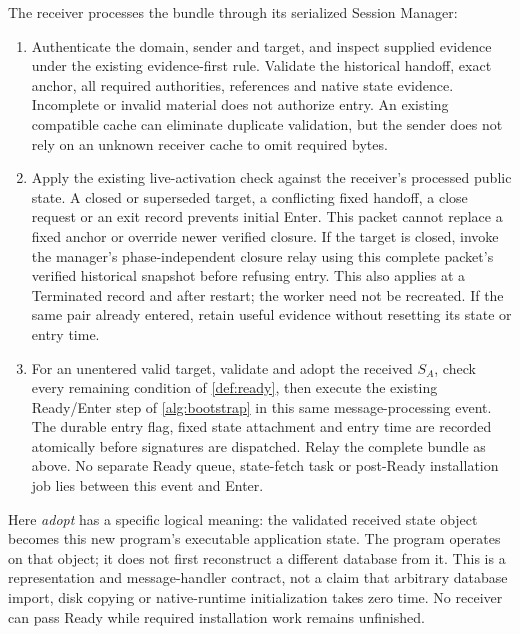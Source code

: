 The receiver processes the bundle through its serialized Session Manager:
\begin{enumerate}[label=(\roman*),itemsep=2pt]
\item Authenticate the domain, sender and target, and inspect supplied
evidence under the existing evidence-first rule. Validate the historical
handoff, exact anchor, all required authorities, references and native
state evidence. Incomplete or invalid material does not authorize entry.
An existing compatible cache can eliminate duplicate validation, but the
sender does not rely on an unknown receiver cache to omit required bytes.
\item Apply the existing live-activation check against the receiver's
processed public state. A closed or superseded target, a conflicting fixed
handoff, a close request or an exit record prevents initial Enter. This
packet cannot replace a fixed anchor or override newer verified closure.
If the target is closed, invoke the manager's phase-independent closure
relay using this complete packet's verified historical snapshot before
refusing entry. This also applies at a Terminated record and after restart;
the worker need not be recreated. If the same pair already entered,
retain useful evidence without resetting
its state or entry time.
\item For an unentered valid target, validate and adopt the received
$S_A$, check every remaining condition of \cref{def:ready}, then execute
the existing Ready/Enter step of \cref{alg:bootstrap} in this same
message-processing event. The durable entry flag, fixed state attachment
and entry time are recorded atomically before signatures are dispatched.
Relay the complete bundle as above. No separate Ready queue, state-fetch
task or post-Ready installation job lies between this event and Enter.
\end{enumerate}

Here \emph{adopt} has a specific logical meaning: the validated received
state object becomes this new program's executable application state.
The program operates on that object; it does not first reconstruct a
different database from it. This is a representation and message-handler
contract, not a claim that arbitrary database import, disk copying or
native-runtime initialization takes zero time. No receiver can pass Ready
while required installation work remains unfinished.

